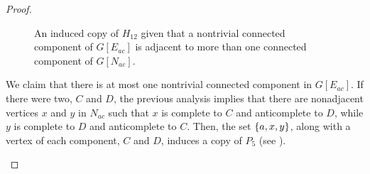 \begin{proof}
\begin{enumerate}[label=(\roman*)]
            \begin{figure}[htb!]
                \centering
                \caption{An induced copy of $H_{12}$ given that a nontrivial
                    connected component of $G[E_{ac}]$ is adjacent to more than
                    one connected component of $G[N_{ac}]$.}
                \label{fig:type_3bag_4_2}
            \end{figure}

            We claim that there is at most one nontrivial connected component in
            $G[E_{ac}]$. If there were two, $C$ and $D$, the previous analysis
            implies that there are nonadjacent vertices $x$ and $y$ in $N_{ac}$
            such that $x$ is complete to $C$ and anticomplete to $D$, while $y$
            is complete to $D$ and anticomplete to $C$. Then, the set
            $\left\{a,x,y\right\}$, along with a vertex of each component, $C$ and $D$,
            induces a copy of $P_5$ (see ).


\end{enumerate}
\end{proof}
